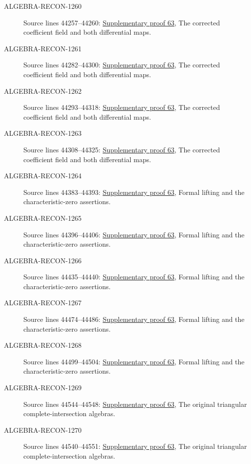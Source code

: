 \begin{description}
\item[ALGEBRA-RECON-1260] Source lines 44257--44260: \hyperlink{algebra_field_formal_smooth_notes_20260929}{Supplementary proof 63}, The corrected coefficient field and both differential maps.
\item[ALGEBRA-RECON-1261] Source lines 44282--44300: \hyperlink{algebra_field_formal_smooth_notes_20260929}{Supplementary proof 63}, The corrected coefficient field and both differential maps.
\item[ALGEBRA-RECON-1262] Source lines 44293--44318: \hyperlink{algebra_field_formal_smooth_notes_20260929}{Supplementary proof 63}, The corrected coefficient field and both differential maps.
\item[ALGEBRA-RECON-1263] Source lines 44308--44325: \hyperlink{algebra_field_formal_smooth_notes_20260929}{Supplementary proof 63}, The corrected coefficient field and both differential maps.
\item[ALGEBRA-RECON-1264] Source lines 44383--44393: \hyperlink{algebra_field_formal_smooth_notes_20260929}{Supplementary proof 63}, Formal lifting and the characteristic-zero assertions.
\item[ALGEBRA-RECON-1265] Source lines 44396--44406: \hyperlink{algebra_field_formal_smooth_notes_20260929}{Supplementary proof 63}, Formal lifting and the characteristic-zero assertions.
\item[ALGEBRA-RECON-1266] Source lines 44435--44440: \hyperlink{algebra_field_formal_smooth_notes_20260929}{Supplementary proof 63}, Formal lifting and the characteristic-zero assertions.
\item[ALGEBRA-RECON-1267] Source lines 44474--44486: \hyperlink{algebra_field_formal_smooth_notes_20260929}{Supplementary proof 63}, Formal lifting and the characteristic-zero assertions.
\item[ALGEBRA-RECON-1268] Source lines 44499--44504: \hyperlink{algebra_field_formal_smooth_notes_20260929}{Supplementary proof 63}, Formal lifting and the characteristic-zero assertions.
\item[ALGEBRA-RECON-1269] Source lines 44544--44548: \hyperlink{algebra_field_formal_smooth_notes_20260929}{Supplementary proof 63}, The original triangular complete-intersection algebras.
\item[ALGEBRA-RECON-1270] Source lines 44540--44551: \hyperlink{algebra_field_formal_smooth_notes_20260929}{Supplementary proof 63}, The original triangular complete-intersection algebras.
\end{description}

